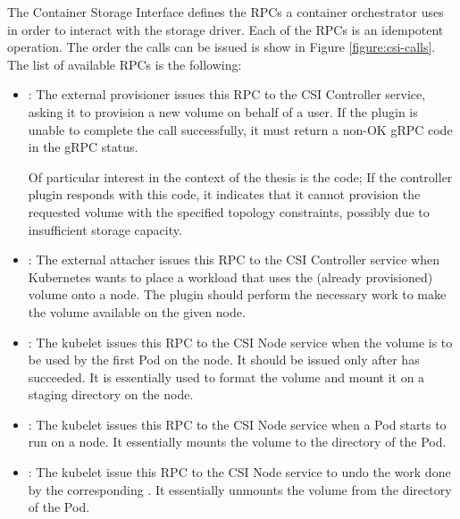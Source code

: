 The Container Storage Interface defines the RPCs a container orchestrator uses
in order to interact with the storage driver. Each of the RPCs is an idempotent
operation. The order the calls can be issued is show in Figure
\ref{figure:csi-calls}. The list of available RPCs is the following:

\begin{itemize}

      \item{}: The external provisioner issues this RPC to the
            CSI Controller service, asking it to provision a new volume on
            behalf of a user. If the plugin is unable to complete the
             call successfully, it must return a non-OK gRPC
            code in the gRPC status.

            Of particular interest in the context of the thesis is the
             code; If the controller plugin responds
            with this code, it indicates that it cannot provision the requested
            volume with the specified topology constraints, possibly due to
            insufficient storage capacity.

      \item{}: The external attacher issues
            this RPC to the CSI Controller service when Kubernetes wants to
            place a workload that uses the (already provisioned) volume onto a
            node. The plugin should perform the necessary work to make the
            volume available on the given node.

      \item{}:  The kubelet issues this RPC to the  CSI Node
            service when the volume is to be used by the first Pod on the node.
            It should be issued only after  has succeeded.
            It is essentially used to format the volume and mount it on a
            staging directory on the node.

      \item{}: The  kubelet issues this RPC to the  CSI
            Node service when a Pod starts to run on a node. It essentially
            mounts the volume to the directory of the Pod.

      \item{}: The kubelet issue this RPC to the CSI
            Node service to undo the work done by the corresponding
            . It essentially unmounts the volume from the
            directory of the Pod.


\end{itemize}
